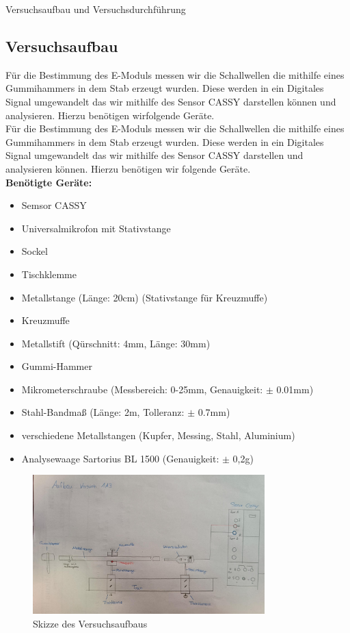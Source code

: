 \documentclass[twoside]{protokoll}
\begin{document}
\begin{aufgabe}{Versuchsaufbau und Versuchsdurchführung}
\subsection{Versuchsaufbau}
  Für die Bestimmung des E-Moduls messen wir die Schallwellen die mithilfe eines Gummihammers in dem Stab erzeugt wurden.
    Diese werden in ein Digitales Signal umgewandelt das wir mithilfe des Sensor CASSY darstellen können und analysieren.
    Hierzu benötigen wirfolgende Geräte.\\

    Für die Bestimmung des E-Moduls messen wir die Schallwellen die mithilfe eines Gummihammers in dem Stab erzeugt wurden.
    Diese werden in ein Digitales Signal umgewandelt das wir mithilfe des Sensor CASSY darstellen und analysieren können.
    Hierzu benötigen wir folgende Geräte.\\

\textbf{Benötigte Geräte:}
\begin{itemize}
\item Semsor CASSY
\item Universalmikrofon mit Stativstange
\item Sockel
\item Tischklemme
\item Metallstange (Länge: 20cm) (Stativstange für Kreuzmuffe)
\item Kreuzmuffe
\item Metallstift (Qürschnitt: 4mm, Länge: 30mm)
\item Gummi-Hammer
\item Mikrometerschraube (Messbereich: 0-25mm, Genauigkeit: $\pm$ 0.01mm)
\item Stahl-Bandmaß (Länge: 2m, Tolleranz: $\pm$ 0.7mm)
\item verschiedene Metallstangen (Kupfer, Messing, Stahl, Aluminium)
\item Analysewaage Sartorius BL 1500 (Genauigkeit: $\pm$ 0,2g)
\end{itemize}


\begin{figure}[h]
  \centering
  \includegraphics[width=0.8\textwidth]{Bilder/434170_428396_1A3_SkizzeAufbau.pdf}
  \caption{Skizze des Versuchsaufbaus}
  \centering
\end{figure}
 

\end{aufgabe}
\end{document}
